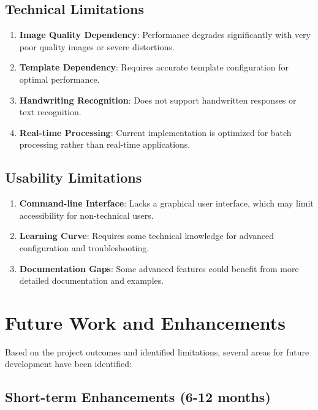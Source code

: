 \subsection{Technical Limitations}

\begin{enumerate}
\item \textbf{Image Quality Dependency}: Performance degrades significantly with very poor quality images or severe distortions.

\item \textbf{Template Dependency}: Requires accurate template configuration for optimal performance.

\item \textbf{Handwriting Recognition}: Does not support handwritten responses or text recognition.

\item \textbf{Real-time Processing}: Current implementation is optimized for batch processing rather than real-time applications.
\end{enumerate}

\subsection{Usability Limitations}

\begin{enumerate}
\item \textbf{Command-line Interface}: Lacks a graphical user interface, which may limit accessibility for non-technical users.

\item \textbf{Learning Curve}: Requires some technical knowledge for advanced configuration and troubleshooting.

\item \textbf{Documentation Gaps}: Some advanced features could benefit from more detailed documentation and examples.
\end{enumerate}

\section{Future Work and Enhancements}

Based on the project outcomes and identified limitations, several areas for future development have been identified:

\subsection{Short-term Enhancements (6-12 months)}

